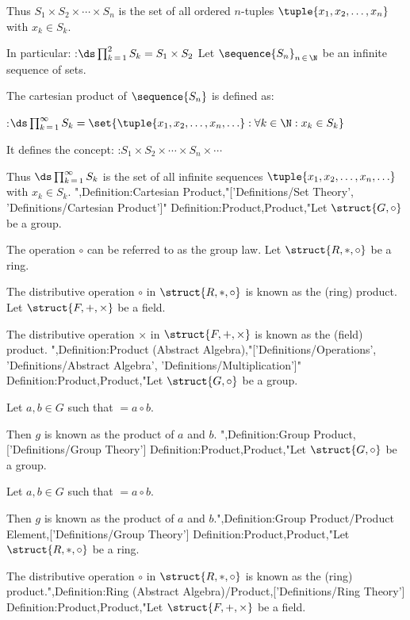 Thus $S_1 \times S_2 \times \cdots \times S_n$ is the set of all ordered $n$-tuples $\tuple {x_1, x_2, \ldots, x_n}$ with $x_k \in S_k$.


In particular:
:$\ds \prod_{k \mathop = 1}^2 S_k = S_1 \times S_2$
Let $\sequence {S_n}_{n \mathop \in \N}$ be an infinite sequence of sets. 

The cartesian product of $\sequence {S_n}$ is defined as:

:$\ds \prod_{k \mathop = 1}^\infty S_k = \set {\tuple {x_1, x_2, \ldots, x_n, \ldots}: \forall k \in \N: x_k \in S_k}$


It defines the concept:
:$S_1 \times S_2 \times \cdots \times S_n \times \cdots$

Thus $\ds \prod_{k \mathop = 1}^\infty S_k$ is the set of all infinite sequences $\tuple {x_1, x_2, \ldots, x_n, \ldots}$ with $x_k \in S_k$.
",Definition:Cartesian Product,"['Definitions/Set Theory', 'Definitions/Cartesian Product']"
Definition:Product,Product,"Let $\struct {G, \circ}$ be a group.


The operation $\circ$ can be referred to as the group law.
Let $\struct {R, *, \circ}$ be a ring.


The distributive operation $\circ$ in $\struct {R, *, \circ}$ is known as the (ring) product.
Let $\struct {F, +, \times}$ be a field.


The distributive operation $\times$ in $\struct {F, +, \times}$ is known as the (field) product.
",Definition:Product (Abstract Algebra),"['Definitions/Operations', 'Definitions/Abstract Algebra', 'Definitions/Multiplication']"
Definition:Product,Product,"Let $\struct {G, \circ}$ be a group.


Let $a, b \in G$ such that $ = a \circ b$.

Then $g$ is known as the product of $a$ and $b$.
",Definition:Group Product,['Definitions/Group Theory']
Definition:Product,Product,"Let $\struct {G, \circ}$ be a group.


Let $a, b \in G$ such that $ = a \circ b$.

Then $g$ is known as the product of $a$ and $b$.",Definition:Group Product/Product Element,['Definitions/Group Theory']
Definition:Product,Product,"Let $\struct {R, *, \circ}$ be a ring.


The distributive operation $\circ$ in $\struct {R, *, \circ}$ is known as the (ring) product.",Definition:Ring (Abstract Algebra)/Product,['Definitions/Ring Theory']
Definition:Product,Product,"Let $\struct {F, +, \times}$ be a field.


